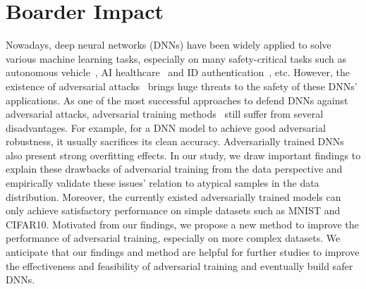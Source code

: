 \section{Boarder Impact}\label{app:board}

Nowadays, deep neural networks (DNNs) have been widely applied to solve various machine learning tasks, especially on many safety-critical tasks such as autonomous vehicle~\cite{fagnant2015preparing}, AI healthcare~\cite{jiang2017artificial} and ID authentication~\cite{mohammed2011human}, etc. However, the existence of adversarial attacks~\cite{xu2019adversarial} brings huge threats to the safety of these DNNs' applications. As one of the most successful approaches to defend DNNs against adversarial attacks, adversarial training methods~\cite{madry2017towards, zhang2016understanding} still suffer from several disadvantages. For example, for a DNN model to achieve good adversarial robustness, it usually sacrifices its clean accuracy. Adversarially trained DNNs also present strong overfitting effects. In our study, we draw important findings to explain these drawbacks of adversarial training from the data perspective and empirically validate these issues' relation to atypical samples in the data distribution. Moreover, the currently existed adversarially trained models can only achieve satisfactory performance on simple datasets such as MNIST and CIFAR10. Motivated from our findings, we propose a new method to improve the performance of adversarial training, especially on more complex datasets. We anticipate that our findings and method are helpful for further studies to improve the effectiveness and feasibility of adversarial training and eventually build safer DNNs.